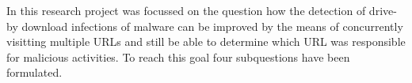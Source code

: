 

In this research project was focussed on the question how the detection of drive-by download infections of malware can be improved by the means of concurrently visitting multiple URLs and still be able to determine which URL was responsible for malicious activities. To reach this goal four subquestions have been formulated.

